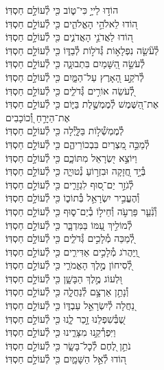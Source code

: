 \documentclass[twoside, openany, parskip=half, 11pt]{book}
\begin{document}
\begin{narrow}
הוֹד֣וּ לַייָ֣ כִּי־ט֑וֹב \hfill
כִּ֖י לְ֯עוֹלָ֣ם חַסְדּֽוֹ׃\\
ה֭וֹדוּ לֵאלֹהֵ֣י הָאֱלֹהִ֑ים \hfill כִּ֖י לְ֯עוֹלָ֣ם חַסְדּֽוֹ׃\\
ה֭וֹדוּ לַאֲדֹנֵ֣י הָאֲדֹנִ֑ים \hfill כִּ֖י לְ֯עוֹלָ֣ם חַסְדּֽוֹ׃\\
לְ֯עֹ֘שֵׂ֤ה נִפְלָא֣וֹת גְּ֯דֹל֣וֹת לְ֯בַדּ֑וֹ \hfill כִּ֖י לְ֯עוֹלָ֣ם חַסְדּֽוֹ׃\\
לְ֯עֹשֵׂ֣ה הַ֭שָּׁמַיִם בִּתְבוּנָ֑ה \hfill כִּ֖י לְ֯עוֹלָ֣ם חַסְדּֽוֹ׃\\
לְ֯רֹקַ֣ע הָ֭אָרֶץ עַל־הַמָּ֑יִם \hfill כִּ֖י לְ֯עוֹלָ֣ם חַסְדּֽוֹ׃\\
לְ֭֯עֹשֵׂה אוֹרִ֣ים גְּ֯דֹלִ֑ים \hfill כִּ֖י לְ֯עוֹלָ֣ם חַסְדּֽוֹ׃\\
אֶת־הַ֭שֶּׁמֶשׁ לְ֯מֶמְשֶׁ֣לֶת בַּיּ֑וֹם \hfill כִּ֖י לְ֯עוֹלָ֣ם חַסְדּֽוֹ׃\\
אֶת־הַיָּרֵ֣חַ וְ֭֯כוֹכָבִים \hfill \\ לְ֯מֶמְשְׁ֯ל֣וֹת בַּלָּ֑יְ֯לָה \hfill כִּ֖י לְ֯עוֹלָ֣ם חַסְדּֽוֹ׃\\
לְ֯מַכֵּ֣ה מִ֭צְרַיִם בִּבְכוֹרֵיהֶ֑ם \hfill כִּ֖י לְ֯עוֹלָ֣ם חַסְדּֽוֹ׃\\
וַיּוֹצֵ֣א יִ֭שְׂרָאֵל מִתּוֹכָ֑ם \hfill כִּ֖י לְ֯עוֹלָ֣ם חַסְדּֽוֹ׃\\
בְּ֯יָ֣ד חֲ֭זָקָה וּבִזְר֣וֹעַ נְ֯טוּיָ֑ה \hfill כִּ֖י לְ֯עוֹלָ֣ם חַסְדּֽוֹ׃\\
לְ֯גֹזֵ֣ר יַם־ס֭וּף לִגְזָרִ֑ים \hfill כִּ֖י לְ֯עוֹלָ֣ם חַסְדּֽוֹ׃\\
וְ֯הֶעֱבִ֣יר יִשְׂרָאֵ֣ל בְּ֯תוֹכ֑וֹ \hfill כִּ֖י לְ֯עוֹלָ֣ם חַסְדּֽוֹ׃\\
וְ֯נִ֘עֵ֤ר פַּרְעֹ֣ה וְ֯חֵיל֣וֹ בְ֯יַם־ס֑וּף \hfill כִּ֖י לְ֯עוֹלָ֣ם חַסְדּֽוֹ׃\\
לְ֯מוֹלִ֣יךְ עַ֭מּוֹ בַּמִּדְבָּ֑ר \hfill כִּ֖י לְ֯עוֹלָ֣ם חַסְדּֽוֹ׃\\
לְ֭֯מַכֵּה מְ֯לָכִ֣ים גְּ֯דֹלִ֑ים \hfill כִּ֖י לְ֯עוֹלָ֣ם חַסְדּֽוֹ׃\\
וַֽ֭יַּהֲרֹג מְ֯לָכִ֣ים אַדִּירִ֑ים \hfill כִּ֖י לְ֯עוֹלָ֣ם חַסְדּֽוֹ׃\\
לְ֭֯סִיחוֹן מֶ֣לֶךְ הָאֱמֹרִ֑י \hfill כִּ֖י לְ֯עוֹלָ֣ם חַסְדּֽוֹ׃\\
וּ֭לְעוֹג מֶ֣לֶךְ הַבָּשָׁ֑ן \hfill כִּ֖י לְ֯עוֹלָ֣ם חַסְדּֽוֹ׃\\
וְ֯נָתַ֣ן אַרְצָ֣ם לְ֯נַחֲלָ֑ה \hfill כִּ֖י לְ֯עוֹלָ֣ם חַסְדּֽוֹ׃\\
נַ֭חֲלָה לְ֯יִשְׂרָאֵ֣ל עַבְדּ֑וֹ \hfill כִּ֖י לְ֯עוֹלָ֣ם חַסְדּֽוֹ׃\\
שֶׁ֭בְּ֯שִׁפְלֵנוּ זָ֣כַר לָ֑נוּ \hfill כִּ֖י לְ֯עוֹלָ֣ם חַסְדּֽוֹ׃\\
וַיִּפְרְ֯קֵ֥נוּ מִצָּרֵ֑ינוּ \hfill כִּ֖י לְ֯עוֹלָ֣ם חַסְדּֽוֹ׃\\
נֹתֵ֣ן לֶ֭חֶם לְ֯כׇל־בָּשָׂ֑ר \hfill כִּ֖י לְ֯עוֹלָ֣ם חַסְדּֽוֹ׃\\
ה֭וֹדוּ לְ֯אֵ֣ל הַשָּׁמָ֑יִם \hfill כִּ֖י לְ֯עוֹלָ֣ם חַסְדּֽוֹ׃\\



\end{narrow}
\end{document}
